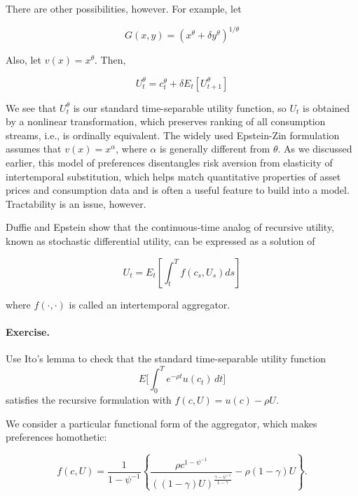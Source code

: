 \documentclass[\topdir/lecture\_notes.tex]{subfiles}
\begin{document}
There are other possibilities, however. For example, let

\begin{equation}
G(x, y)=\left(x^{\theta}+\delta y^{\theta}\right)^{1 / \theta}
\end{equation}

Also, let $v(x)=x^{\theta}$. Then,

\begin{equation}
U_{t}^{\theta}=c_{t}^{\theta}+\delta E_{t}\left[U_{t+1}^{\theta}\right]
\end{equation}

We see that $U_{t}^{\theta}$ is our standard time-separable utility function, so $U_{t}$ is obtained by a nonlinear transformation, which preserves ranking of all consumption streams, i.e., is ordinally equivalent. The widely used Epstein-Zin formulation assumes that $v(x)=x^{\alpha}$, where $\alpha$ is generally different from $\theta$. As we discussed earlier, this model of preferences disentangles risk aversion from elasticity of intertemporal substitution, which helps match quantitative properties of asset prices and consumption data and is often a useful feature to build into a model. Tractability is an issue, however.

Duffie and Epstein show that the continuous-time analog of recursive utility, known as stochastic differential utility, can be expressed as a solution of

\begin{equation}
U_{t}=E_{t}\left[\int_{t}^{T} f\left(c_{s}, U_{s}\right) d s\right]
\end{equation}

where $f(\cdot, \cdot)$ is called an intertemporal aggregator.

\paragraph{Exercise.} Use Ito's lemma to check that the standard time-separable utility function
\[
E\Bigg[\int_{0}^{T} e^{-\rho t} u(c_{t}) \, d t\Bigg]
\]
satisfies the recursive formulation with $f(c, U)=u(c)-\rho U$.

We consider a particular functional form of the aggregator, which makes preferences homothetic:

\begin{equation}
f(c, U)=\frac{1}{1-\psi^{-1}}\left\{\frac{\rho c^{1-\psi^{-1}}}{((1-\gamma) U)^{\frac{\gamma-\psi^{-1}}{1-\gamma}}}-\rho(1-\gamma) U\right\} .
\end{equation}
\end{document}
